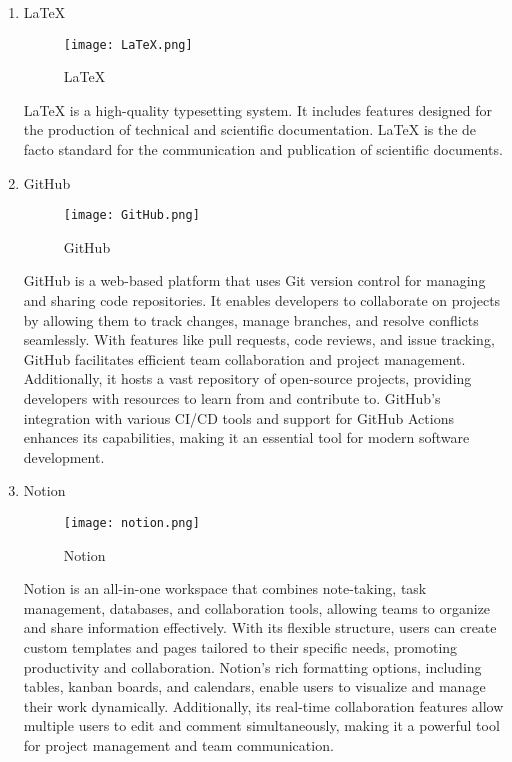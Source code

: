 \documentclass[conference]{IEEEtran}
\begin{document}
\begin{enumerate}[itemsep=2ex, parsep=1ex]
	\item LaTeX
	      	      	      
	      \begin{figure}[h!]
	      	\centering
	      	\texttt{[image: LaTeX.png]}
	      	\caption{LaTeX}
	      	\label{fig:LaTeX}
	      \end{figure}
	      	      	      
	      LaTeX is a high-quality typesetting system. It includes features designed for
	      the production of technical and scientific documentation. LaTeX is the de
	      facto standard for the communication and publication of scientific
	      documents.
	      	      
	      \vspace{5cm}
	      	      	      
	\item GitHub
	      	      	      
	      \begin{figure}[h!]
	      	\centering
	      	\texttt{[image: GitHub.png]}
	      	\caption{GitHub}
	      	\label{fig:GitHub}
	      \end{figure}
	      	      	      
	      GitHub is a web-based platform that uses Git version control for managing
	      and sharing code repositories. It enables developers to collaborate on projects
	      by allowing them to track changes, manage branches, and resolve conflicts seamlessly.
	      With features like pull requests, code reviews, and issue tracking, GitHub
	      facilitates efficient team collaboration and project management.
	      Additionally, it hosts a vast repository of open-source projects,
	      providing developers with resources to learn from and contribute to. GitHub's
	      integration with various CI/CD tools and support for GitHub Actions enhances
	      its capabilities, making it an essential tool for modern software
	      development.
	      	      	      
	\item Notion
	      	      	      
	      \begin{figure}[h!]
	      	\centering
	      	\texttt{[image: notion.png]}
	      	\caption{Notion}
	      	\label{fig:Notion}
	      \end{figure}
	      	      	      
	      Notion is an all-in-one workspace that combines note-taking, task management,
	      databases, and collaboration tools, allowing teams to organize and share
	      information effectively. With its flexible structure, users can create
	      custom templates and pages tailored to their specific needs, promoting productivity
	      and collaboration. Notion's rich formatting options, including tables,
	      kanban boards, and calendars, enable users to visualize and manage their
	      work dynamically. Additionally, its real-time collaboration features allow
	      multiple users to edit and comment simultaneously, making it a powerful tool
	      for project management and team communication.
	      	      

\end{enumerate}
\end{document}
